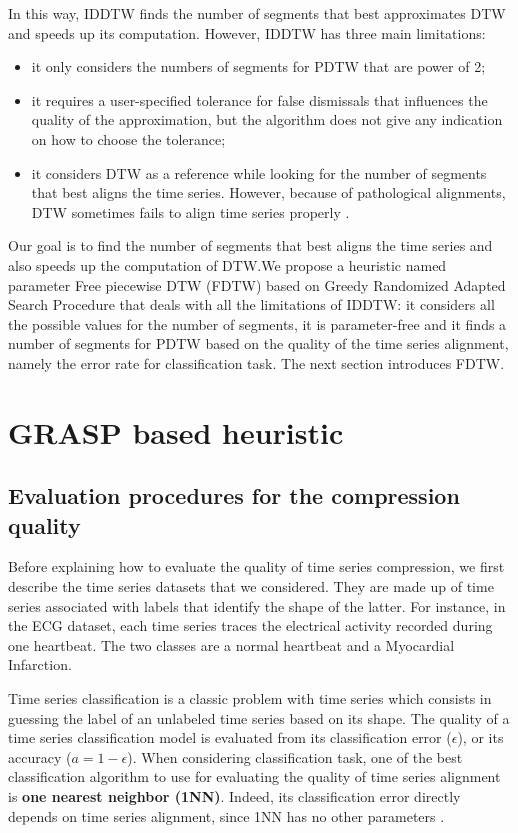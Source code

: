 In this way, IDDTW finds the number of segments that best approximates DTW and speeds up its computation. However, IDDTW has three main limitations:

\begin{itemize}
  \item it only considers the numbers of segments for PDTW that are
  power of 2;
  \item it requires a user-specified tolerance for false dismissals
  that influences the quality of the approximation, but the algorithm does not give any indication on how to choose the tolerance;
  \item it considers DTW as a reference while looking for the  number of segments that best aligns the time series. However, because of pathological alignments, DTW sometimes fails to align time series properly \cite{Keogh_Pazzani_2001}.
\end{itemize}


Our goal is to find the number of segments that best aligns the time series and also speeds up the computation of DTW.We propose a  heuristic named parameter Free piecewise DTW (FDTW) based on Greedy Randomized Adapted Search Procedure that deals with all the limitations of IDDTW: it considers all the possible values for the number of segments, it is parameter-free and it finds a number of segments for PDTW based on the quality of  the time series alignment, namely the error rate for classification task. The next section introduces FDTW.




\section{GRASP based heuristic}
\label{sec:3}


\subsection{ Evaluation procedures for the compression quality}
Before explaining how to evaluate the quality of time series compression, we
first describe the time series datasets that we considered. They are
made up of time series associated with labels that identify the shape of the
latter. For instance, in the ECG dataset, each time series traces the
electrical activity recorded during one heartbeat. The two classes are a normal
heartbeat and a Myocardial Infarction. 

 Time series classification is a classic problem with time
series which consists in guessing the label of an unlabeled time series  based on its shape.
The quality of a time series classification model is evaluated from its classification error ($\epsilon$), or its accuracy ($a = 1 - \epsilon$).  When considering classification task, one of the
best classification algorithm to use for evaluating the quality of time series
alignment is \textbf{one nearest neighbor (1NN)}. Indeed,  its classification
error directly depends on time series alignment, since 1NN has no other parameters \cite{wang2013experimental}.


